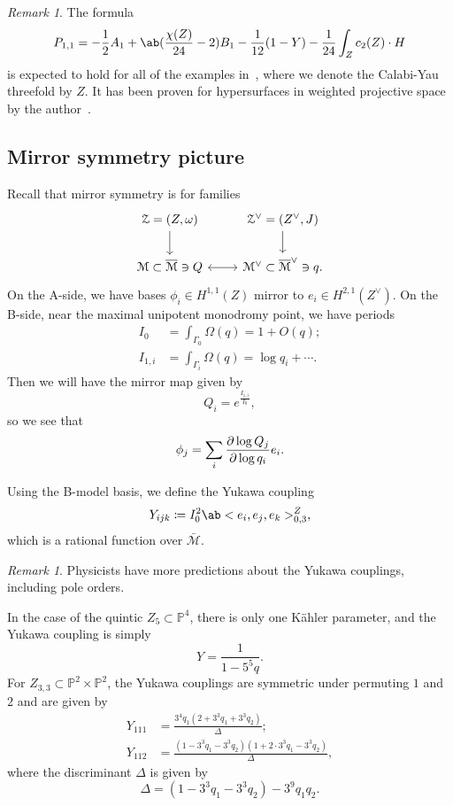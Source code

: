 \documentclass[10pt]{amsart}
\theoremstyle{definition}
\theoremstyle{remark}
\newtheorem{rmk}[thm]{Remark}
\theoremstyle{plain}
\theoremstyle{definition}
\theoremstyle{remark}
\renewcommand{\P}{\mathbb{P}}
\newcommand{\M}{\mathcal{M}}
\newcommand{\Mbar}{\overline{\mathcal{M}}}
\newcommand{\mc}[1]{\mathcal{#1}}
\newcommand{\1}{\mathbf{1}}
\newcommand{\2}{\mathbf{2}}
\newcommand{\3}{\mathbf{3}}
\begin{document}
\begin{rmk}
    The formula
    \[ P_{1,1} = -\frac{1}{2} A_1 + \ab(\frac{\chi(Z)}{24} -2) B_1 - \frac{1}{12}(1-Y) - \frac{1}{24} \int_Z c_2(Z) \cdot H \]
    is expected to hold for all of the examples in~, where we denote the Calabi-Yau threefold by $Z$. It has been proven for hypersurfaces in weighted projective space by the author~\cite{polynomiality}.
\end{rmk}


\subsection{Mirror symmetry picture}%
\label{sub:Mirror symmetry picture}

Recall that mirror symmetry is for families
\begin{equation*}
\begin{tikzcd}
    \mc{Z} = (Z,\omega) \ar{d} & \mc{Z}^{\vee} = (Z^{\vee}, J) \ar{d} \\
    \mc{M} \subset \Mbar \ni Q \ar[leftrightarrow]{r} & \M^{\vee} \subset \Mbar^{\vee} \ni q.
\end{tikzcd}
\end{equation*}
On the A-side, we have bases $\phi_i \in H^{1,1}(Z)$ mirror to $e_i \in H^{2,1}(Z^{\vee})$. On the B-side, near the maximal unipotent monodromy point, we have periods
\begin{align*}
    I_0 &= \int_{\Gamma_0} \Omega(q) = 1 + O(q); \\
    I_{1,i} &= \int_{\Gamma_i} \Omega(q) = \log q_i + \cdots.
\end{align*}
Then we will have the mirror map given by
\[ Q_i = e^{\frac{I_{1,i}}{I_0}}, \]
so we see that
\[ \phi_j = \sum_i \pdv{\log Q_j}{\log q_i} e_i. \]

Using the B-model basis, we define the Yukawa coupling
\[ Y_{ijk} \coloneqq I_0^2 \ab<e_i, e_j, e_k>_{0,3}^Z, \]
which is a rational function over $\bar{\M}$.

\begin{rmk}
    Physicists have more predictions about the Yukawa couplings, including pole orders.
\end{rmk}

In the case of the quintic $Z_5 \subset \P^4$, there is only one K\"ahler parameter, and the Yukawa coupling is simply
\[ Y = \frac{1}{1-5^5 q}. \]
For $Z_{3,3} \subset \P^2 \times \P^2$, the Yukawa couplings are symmetric under permuting $1$ and $2$ and are given by
\begin{align*}
    Y_{111} &= \frac{3^4 q_1 (2+3^3 q_1 + 3^3 q_2)}{\Delta}; \\
    Y_{112} &= \frac{(1-3^3 q_1 - 3^3 q_2)(1+2 \cdot 3^3 q_1 - 3^3 q_2)}{\Delta},
\end{align*}
where the discriminant $\Delta$ is given by
\[ \Delta = (1-3^3 q_1 - 3^3 q_2) - 3^9 q_1 q_2. \]
\end{document}
